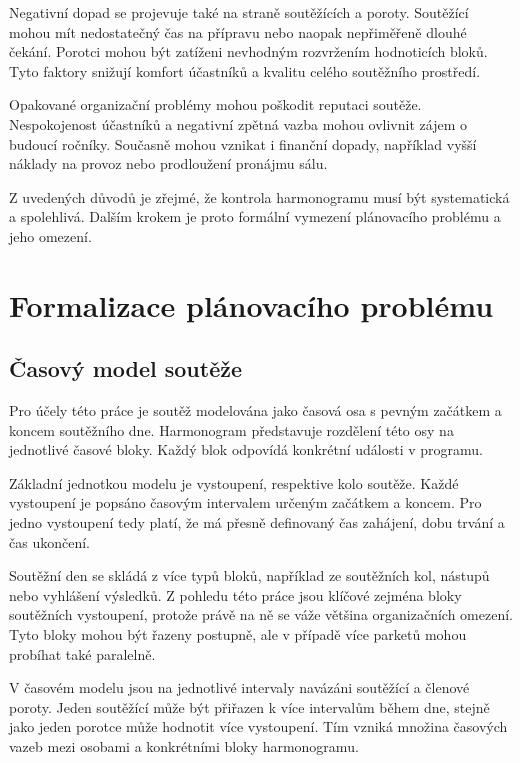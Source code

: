 \documentclass[czech, kiv, ba, he, iso690alph, pdf]{fasthesis}
\begin{document}
				Negativní dopad se projevuje také na straně soutěžících a poroty. Soutěžící mohou mít nedostatečný čas na přípravu nebo naopak nepřiměřeně dlouhé čekání. Porotci mohou být zatíženi nevhodným rozvržením hodnoticích bloků. Tyto faktory snižují komfort účastníků a kvalitu celého soutěžního prostředí.
	
				Opakované organizační problémy mohou poškodit reputaci soutěže. Nespokojenost účastníků a negativní zpětná vazba mohou ovlivnit zájem o budoucí ročníky. Současně mohou vznikat i finanční dopady, například vyšší náklady na provoz nebo prodloužení pronájmu sálu.
	
				Z uvedených důvodů je zřejmé, že kontrola harmonogramu musí být systematická a spolehlivá. Dalším krokem je proto formální vymezení plánovacího problému a jeho omezení.
	

		\section{Formalizace plánovacího problému}


			\subsection{Časový model soutěže}
	
				Pro účely této práce je soutěž modelována jako časová osa s pevným začátkem a koncem soutěžního dne. Harmonogram představuje rozdělení této osy na jednotlivé časové bloky. Každý blok odpovídá konkrétní události v programu.
	
				Základní jednotkou modelu je vystoupení, respektive kolo soutěže. Každé vystoupení je popsáno časovým intervalem určeným začátkem a koncem. Pro jedno vystoupení tedy platí, že má přesně definovaný čas zahájení, dobu trvání a čas ukončení.
	
				Soutěžní den se skládá z více typů bloků, například ze soutěžních kol, nástupů nebo vyhlášení výsledků. Z pohledu této práce jsou klíčové zejména bloky soutěžních vystoupení, protože právě na ně se váže většina organizačních omezení. Tyto bloky mohou být řazeny postupně, ale v případě více parketů mohou probíhat také paralelně.
	
				V časovém modelu jsou na jednotlivé intervaly navázáni soutěžící a členové poroty. Jeden soutěžící může být přiřazen k více intervalům během dne, stejně jako jeden porotce může hodnotit více vystoupení. Tím vzniká množina časových vazeb mezi osobami a konkrétními bloky harmonogramu.
	
\end{document}
